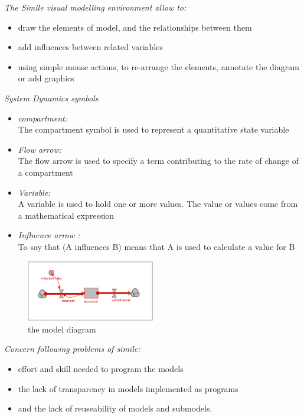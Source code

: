 \emph{The Simile visual modelling environment allow to:}
\begin{itemize}
	\item draw the elements of model, and the relationships between them
	\item add influences between related variables
	\item using simple mouse actions, to re-arrange the elements, annotate the diagram or add graphics
\end{itemize}	
	
\emph{System Dynamics symbols}
\begin{itemize}
	\item \emph{compartment:}\\
The compartment symbol is used to represent a quantitative state variable
	\item \emph{Flow arrow:}\\
The flow arrow is used to specify a term contributing to the rate of change of a compartment
	\item \emph{Variable:}\\
A variable is used to hold one or more values. The value or values come from a mathematical expression
	\item \emph{Influence arrow :}\\
To say that (A influences B) means that A is used to calculate a value for B
\end{itemize}	

\begin{figure}[htbp]
\centering
\includegraphics[width=0.5\textwidth]{pics/account_example.png}
\caption{the model diagram}
\label{fig:the model diagram}	
\end{figure}

\emph{Concern following problems of simile:}
\begin{itemize}
	\item effort and skill needed to program the models
	\item the lack of transparency in models implemented as programs
	\item and the lack of reuseability of models and submodels.
\end{itemize}	
	
